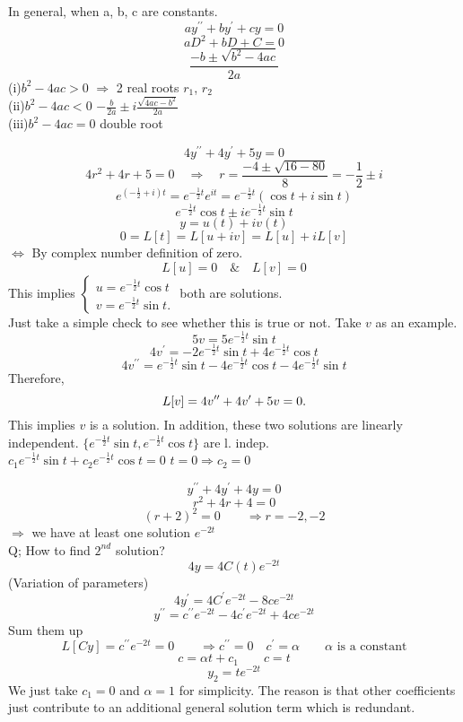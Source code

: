 In general, when a, b, c are constants.
\[ay^{\prime\prime}+by^\prime+cy=0
\]
\[aD^2+bD+C=0
\]
\[\frac{-b\pm\sqrt{b^2-4ac}}{2a}
\]
(i)$b^2-4ac>0$ $\Rightarrow$ 2 real roots $r_1$, $r_2$\\
(ii)$b^2-4ac<0$ $-\frac{b}{2a}\pm i\frac{\sqrt{4ac-b^2}}{2a}$\\
(iii)$b^2-4ac=0$  double root
\begin{example}
\[4y^{\prime\prime}+4y^\prime+5y=0
\]
\[4r^2+4r+5=0\quad\Rightarrow\quad r=\frac{-4\pm\sqrt{16-80}}{8}=-\frac{1}{2}\pm i
\]
\[e^{(-\frac{1}{2}+i)t}=e^{-\frac{1}{2}t}e^{it}=e^{-\frac{1}{2}t}(\cos t+i\sin t)\]
\[e^{-\frac{1}{2}t}\cos t\pm ie^{-\frac{1}{2}t}\sin t
\]
\[y=u(t)+iv(t)
\]
\[0=L[t]=L[u+iv]=L[u]+iL[v]
\]
$\iff$ By complex number definition of zero.
\[L[u]=0 \quad\&\quad L[v]=0
\]
This implies $\left \{	\begin{gathered}
u=e^{-\frac{1}{2}t}\cos t\\
v=e^{-\frac{1}{2}t}\sin t.
\end{gathered}\right.$ both are solutions.\\
Just take a simple check to see whether this is true or not. Take $v$ as an example.
\[5v=5e^{-\frac{1}{2}t}\sin t
\]
\[4v^\prime=-2e^{-\frac{1}{2}t}\sin t+4e^{-\frac{1}{2}t}\cos t
\]
\[4v^{\prime\prime}=e^{-\frac{1}{2}t}\sin t-4e^{-\frac{1}{2}t}\cos t-4e^{-\frac{1}{2}t}\sin t
\]
Therefore,
\[L[v]=4v^{\prime\prime}+4v^{\prime}+5v=0.
\]
This implies $v$ is a solution. In addition, these two solutions are linearly independent.
$\{e^{-\frac{1}{2}t}\sin t,e^{-\frac{1}{2}t}\cos t\}$ are l. indep. \\
$c_1e^{-\frac{1}{2}t}\sin t+c_2e^{-\frac{1}{2}t}\cos t=0$ $t=0\Rightarrow c_2=0$

\end{example}
\begin{example}
\[y^{\prime\prime}+4y^\prime+4y=0
\]
\[r^2+4r+4=0
\]
\[(r+2)^2=0
\qquad\Rightarrow r=-2,-2\]
$\Rightarrow$ we have at least one solution $e^{-2t}$\\
Q; How to find $2^{nd}$ solution?
\[4y=4C(t)e^{-2t}
\](Variation of parameters)
\[4y^\prime=4C^\prime e^{-2t}-8ce^{-2t}
\]
\[y^{\prime\prime}=c^{\prime\prime}e^{-2t}-4c^\prime e^{-2t}+4ce^{-2t}
\]
Sum them up
\[L[Cy]=c^{\prime\prime}e^{-2t}=0\qquad \Rightarrow c^{\prime\prime}=0
 \quad c^\prime=\alpha\qquad\alpha\text{ is a constant}\]
\[c=\alpha t+c_1 \qquad c=t
\]
\[y_2=te^{-2t}
\]
We just take $c_1=0$ and $\alpha=1$ for simplicity. The reason is that other coefficients just contribute to an additional general solution term which is redundant.
\end{example}



